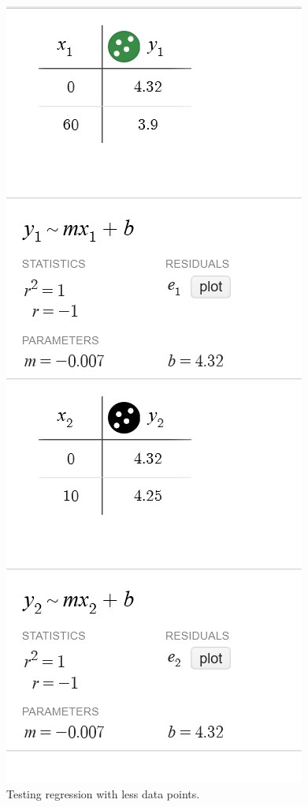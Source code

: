 \documentclass{article}
\begin{document}
\begin{figure}
    \centering
    \includegraphics[height=.5\textheight]{extra.jpg}
    \caption{Testing regression with less data points.}
\end{figure}
\end{document}
